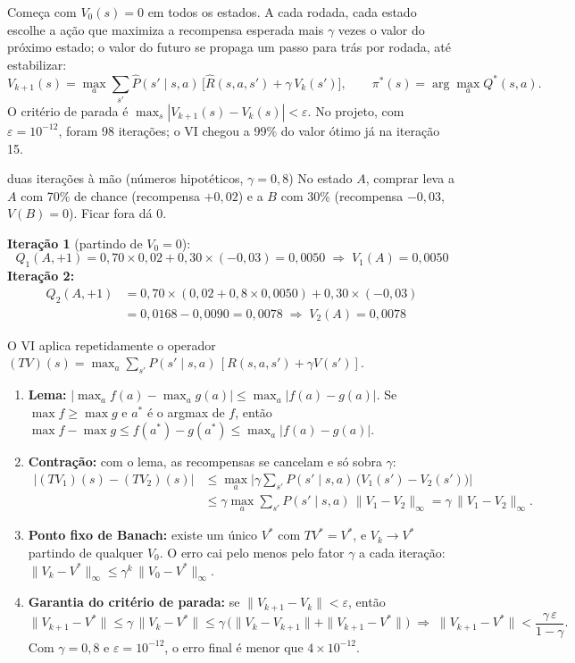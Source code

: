 \documentclass[11pt,a4paper]{article}
\newcommand{\bloco}[1]{\par\needspace{4\baselineskip}{\bfseries #1}\par\nopagebreak}
\begin{document}
Começa com $V_0(s) = 0$ em todos os estados. A cada rodada, cada estado escolhe a ação que maximiza a recompensa esperada mais $\gamma$ vezes o valor do próximo estado; o valor do futuro se propaga um passo para trás por rodada, até estabilizar:
\[
  V_{k+1}(s) = \max_{a} \sum_{s'} \widehat{P}(s' \mid s,a)\,\big[\widehat{R}(s,a,s') + \gamma\, V_k(s')\big], \qquad
  \pi^*(s) = \arg\max_{a} Q^*(s,a).
\]
O critério de parada é $\max_s |V_{k+1}(s) - V_k(s)| < \varepsilon$. No projeto, com $\varepsilon = 10^{-12}$, foram 98 iterações; o VI chegou a 99\% do valor ótimo já na iteração 15.

\begin{exemplo}{duas iterações à mão (números hipotéticos, $\gamma = 0{,}8$)}
No estado $A$, comprar leva a $A$ com 70\% de chance (recompensa $+0{,}02$) e a $B$ com 30\% (recompensa $-0{,}03$, $V(B) = 0$). Ficar fora dá 0.

\textbf{Iteração 1} (partindo de $V_0 = 0$):
\[
  Q_1(A,+1) = 0{,}70 \times 0{,}02 + 0{,}30 \times (-0{,}03) = 0{,}0050 \;\Rightarrow\; V_1(A) = 0{,}0050
\]
\textbf{Iteração 2:}
\[
  \begin{aligned}
    Q_2(A,+1) &= 0{,}70 \times (0{,}02 + 0{,}8 \times 0{,}0050) + 0{,}30 \times (-0{,}03) \\
              &= 0{,}0168 - 0{,}0090 = 0{,}0078 \;\Rightarrow\; V_2(A) = 0{,}0078
  \end{aligned}
\]
\end{exemplo}

\bloco{Por que converge}
O VI aplica repetidamente o operador $(TV)(s) = \max_a \sum_{s'} P(s' \mid s,a)\,[R(s,a,s') + \gamma V(s')]$.
\begin{enumerate}
  \item \textbf{Lema:} $\big|\max_a f(a) - \max_a g(a)\big| \le \max_a |f(a) - g(a)|$. Se $\max f \ge \max g$ e $a^*$ é o argmax de $f$, então $\max f - \max g \le f(a^*) - g(a^*) \le \max_a |f(a) - g(a)|$.
  \item \textbf{Contração:} com o lema, as recompensas se cancelam e só sobra $\gamma$:
  \[
    \begin{aligned}
      |(TV_1)(s) - (TV_2)(s)| &\le \max_a \Big|\gamma \sum_{s'} P(s' \mid s,a)\,\big(V_1(s') - V_2(s')\big)\Big| \\
                              &\le \gamma \max_a \sum_{s'} P(s' \mid s,a)\, \|V_1 - V_2\|_\infty = \gamma\, \|V_1 - V_2\|_\infty.
    \end{aligned}
  \]
  \item \textbf{Ponto fixo de Banach:} existe um único $V^*$ com $TV^* = V^*$, e $V_k \to V^*$ partindo de qualquer $V_0$. O erro cai pelo menos pelo fator $\gamma$ a cada iteração: $\|V_k - V^*\|_\infty \le \gamma^k\, \|V_0 - V^*\|_\infty$.
  \item \textbf{Garantia do critério de parada:} se $\|V_{k+1} - V_k\| < \varepsilon$, então
  \[
    \|V_{k+1} - V^*\| \le \gamma\, \|V_k - V^*\| \le \gamma\,\big(\|V_k - V_{k+1}\| + \|V_{k+1} - V^*\|\big)
    \;\Longrightarrow\; \|V_{k+1} - V^*\| < \frac{\gamma\,\varepsilon}{1 - \gamma}.
  \]
  Com $\gamma = 0{,}8$ e $\varepsilon = 10^{-12}$, o erro final é menor que $4 \times 10^{-12}$.
\end{enumerate}
\end{document}
